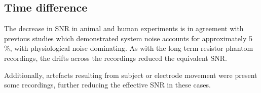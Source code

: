 \subsection{Time difference}
The decrease in SNR in animal and human experiments is in agreement with previous studies \cite{fabrizi2007analysis} which demonstrated system noise accounts for approximately 5 \%, with physiological noise dominating. As with the long term resistor phantom recordings, the drifts across the recordings reduced the equivalent SNR.  



Additionally, artefacts resulting from subject or electrode movement were present some recordings, further reducing the effective SNR in these cases.  
